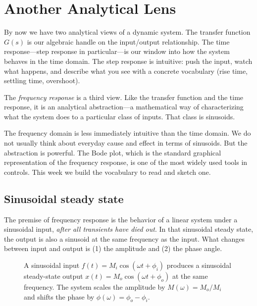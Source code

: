 \documentclass[../../book.tex]{subfiles}
\begin{document}
\graphicspath{{../refs/images/}}

\section{Another Analytical Lens}
\label{sec:intro}

By now we have two analytical views of a dynamic system.  The transfer function
$G(s)$ is our algebraic handle on the input/output relationship.  The time
response---step response in particular---is our window into how the system
behaves in the time domain.  The step response is intuitive: push the input,
watch what happens, and describe what you see with a concrete vocabulary (rise
time, settling time, overshoot).

The \emph{frequency response} is a third view.  Like the transfer function and
the time response, it is an analytical abstraction---a mathematical way of
characterizing what the system does to a particular class of inputs.  That
class is sinusoids.

The frequency domain is less immediately intuitive than the time domain.
We do not usually think about everyday cause and effect in terms of sinusoids.
But the abstraction is powerful.  The Bode plot, which is the standard graphical
representation of the frequency response, is one of the most widely used tools
in controls.  This week we build the vocabulary to read and sketch one.

\subsection{Sinusoidal steady state}
\label{sec:sinusoidal}

The premise of frequency response is the behavior of a linear system under a
sinusoidal input, \emph{after all transients have died out}.  In that sinusoidal
steady state, the output is also a sinusoid at the same frequency as the input.
What changes between input and output is (1) the amplitude and (2) the phase
angle.

\begin{figure}[htbp]
  \caption{A sinusoidal input $f(t) = M_i\cos(\omega t + \phi_i)$ produces a
    sinusoidal steady-state output $x(t) = M_o\cos(\omega t + \phi_o)$ at the
    same frequency.  The system scales the amplitude by $M(\omega) = M_o/M_i$
    and shifts the phase by $\phi(\omega) = \phi_o - \phi_i$.}
  \label{fig:sinusoidal}
\end{figure}
\end{document}
